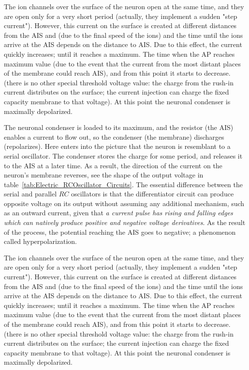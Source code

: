 \fi

\ifx\magyar\undefined


The ion channels over the surface of the neuron open
at the same time, and they are open only for a very short period
(actually, they implement a sudden "step current"). However, this 
current on the surface is created at different distances from the \gls{AIS}
and (due to the final speed of the ions) and the time until the ions 
arrive at the \gls{AIS} depends on the distance to \gls{AIS}.
Due to this effect, the current quickly increases;
until it reaches a maximum. 
The time when the \gls{AP} reaches maximum value (due to the event that
the current from the most distant places of the membrane could reach \gls{AIS}), 
and from this point it starts to decrease.
(there is no other special threshold voltage value:
the charge from the rush-in current distributes on the surface;
the current injection can charge the fixed capacity 
membrane to that voltage).
At this point the neuronal condenser is maximally depolarized.

The neuronal condenser is loaded to its maximum, and the resistor (the \gls{AIS})
enables a current to flow out, so the condenser (the membrane) discharges (repolarizes).
Here enters into the picture that the neuron is resemblant to a serial oscillator.
The condenser stores the charge for some period, and releases it to the \gls{AIS}
at a later time. As a result, the direction of the current on the neuron's
membrane reverses, see the shape of the output voltage in table~\ref{tab:Electric_RCOscillator_Circuits}.
The essential difference between the serial and parallel $RC$ oscillators is
that the differentiator circuit can produce opposite voltage on its output
without assuming any additional mechanism, such as an outward current,
given that \textit{a current pulse has rising and falling edges which can natively produce 
positive and negative voltage derivatives}.
As the result of the process, the potential reaching the AIS goes to negative;
a phenomenon called hyperpolarization.

\else


The ion channels over the surface of the neuron open
at the same time, and they are open only for a very short period
(actually, they implement a sudden "step current"). However, this 
current on the surface is created at different distances from the \gls{AIS}
and (due to the final speed of the ions) and the time until the ions 
arrive at the \gls{AIS} depends on the distance to \gls{AIS}.
Due to this effect, the current quickly increases;
until it reaches a maximum. 
The time when the \gls{AP} reaches maximum value (due to the event that
the current from the most distant places of the membrane could reach \gls{AIS}), 
and from this point it starts to decrease.
(there is no other special threshold voltage value:
the charge from the rush-in current distributes on the surface;
the current injection can charge the fixed capacity 
membrane to that voltage).
At this point the neuronal condenser is maximally depolarized.

